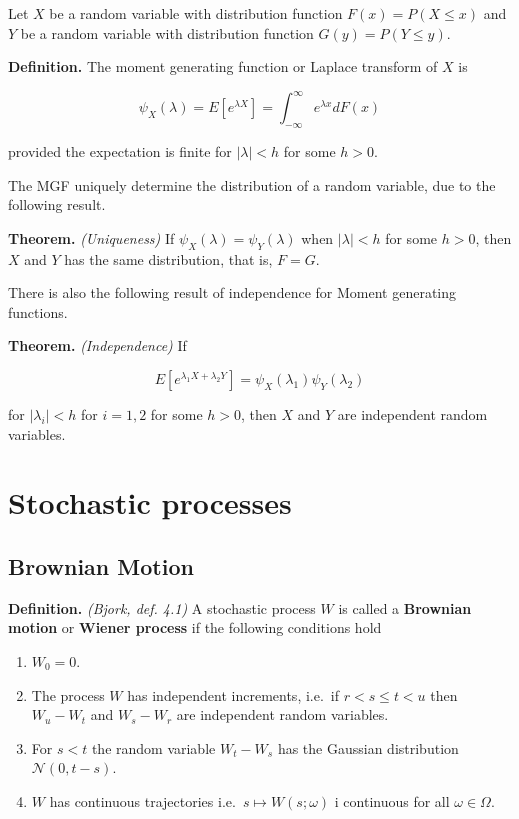 \documentclass[
]{article}
\providecommand{\tightlist}{%
  \setlength{\itemsep}{0pt}\setlength{\parskip}{0pt}}
\begin{document}
Let \(X\) be a random variable with distribution function
\(F(x)=P(X\le x)\) and \(Y\) be a random variable with distribution
function \(G(y)=P(Y\le y)\).

\textbf{Definition.} The moment generating function or Laplace transform
of \(X\) is

\[\psi_X(\lambda)=E\left[e^{\lambda X}\right]=\int_{-\infty}^\infty e^{\lambda x}dF(x)\]

provided the expectation is finite for \(\vert\lambda\vert<h\) for some
\(h>0\).

The MGF uniquely determine the distribution of a random variable, due to
the following result.

\textbf{Theorem.} \emph{(Uniqueness)} If
\(\psi_X(\lambda)=\psi_Y(\lambda)\) when \(\vert\lambda\vert<h\) for
some \(h>0\), then \(X\) and \(Y\) has the same distribution, that is,
\(F=G\).

There is also the following result of independence for Moment generating
functions.

\textbf{Theorem.} \emph{(Independence)} If

\[E\left[e^{\lambda_1X+\lambda_2Y}\right]=\psi_X(\lambda_1)\psi_Y(\lambda_2)\]

for \(\vert\lambda_i\vert<h\) for \(i=1,2\) for some \(h>0\), then \(X\)
and \(Y\) are independent random variables.

\hypertarget{stochastic-processes}{%
\section{Stochastic processes}\label{stochastic-processes}}

\hypertarget{brownian-motion}{%
\subsection{Brownian Motion}\label{brownian-motion}}

\textbf{Definition.} \emph{(Bjork, def. 4.1)} A stochastic process \(W\)
is called a \textbf{Brownian motion} or \textbf{Wiener process} if the
following conditions hold

\begin{enumerate}
\def\labelenumi{\arabic{enumi}.}
\tightlist
\item
  \(W_0=0\).
\item
  The process \(W\) has independent increments, i.e.~if \(r<s\le t< u\)
  then \(W_u-W_t\) and \(W_s-W_r\) are independent random variables.
\item
  For \(s<t\) the random variable \(W_t-W_s\) has the Gaussian
  distribution \(\mathcal{N}(0,t-s)\).
\item
  \(W\) has continuous trajectories i.e.~\(s\mapsto W(s;\omega)\) i
  continuous for all \(\omega \in\Omega\).
\end{enumerate}
\end{document}
